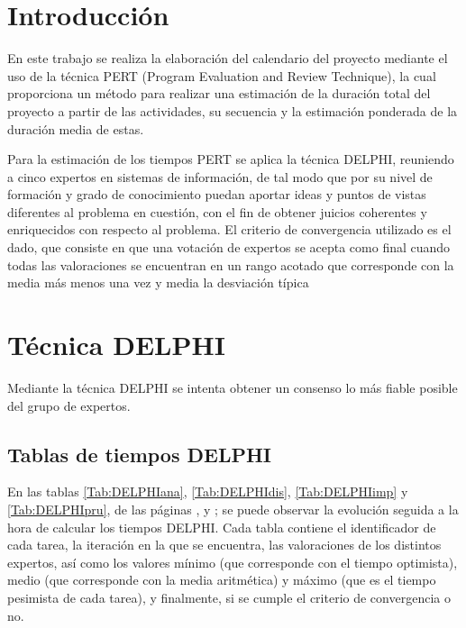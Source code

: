 \documentclass[11pt,a4paper,spanish,twoside]{report}
\begin{document}
\tableofcontents
\listoftables
\listoffigures


\chapter*{Introducción}
En este trabajo se realiza la elaboración del calendario del proyecto
mediante el uso de la técnica PERT (Program Evaluation and Review Technique),
la cual proporciona un método para realizar una estimación de la duración
total del proyecto a partir de las actividades, su secuencia y la estimación
ponderada de la duración media de estas. 

Para la estimación de los tiempos PERT se aplica la técnica DELPHI, reuniendo
a cinco expertos en sistemas de información, de tal modo que por su nivel de
formación y grado de 
conocimiento puedan aportar ideas y puntos de vistas diferentes al problema
en cuestión, con el fin de obtener juicios coherentes y enriquecidos con
respecto al problema. El criterio de convergencia utilizado es el dado, que
consiste en que una votación de expertos se acepta como final cuando todas
las valoraciones se encuentran en un rango acotado que corresponde
con la media más menos una vez y media la desviación típica

\chapter{Técnica DELPHI}
Mediante la técnica DELPHI se intenta obtener un consenso lo más fiable
posible del grupo de expertos.
    
\section{Tablas de tiempos DELPHI}
En las tablas \ref{Tab:DELPHIana}, \ref{Tab:DELPHIdis}, \ref{Tab:DELPHIimp} y
\ref{Tab:DELPHIpru}, de las páginas \pageref{Tab:DELPHIana},
\pageref{Tab:DELPHIdis} y \pageref{Tab:DELPHIimp}; se
puede observar la evolución seguida a la hora de calcular los tiempos
DELPHI. Cada tabla contiene el identificador de cada tarea, la iteración en
la que se encuentra, las valoraciones de los distintos expertos, así como los
valores mínimo (que corresponde con el tiempo optimista), medio (que
corresponde con la media aritmética) y máximo (que es el tiempo pesimista de
cada tarea), y finalmente, si se cumple el criterio de convergencia o no.
\end{document}
